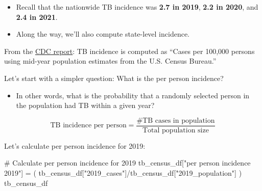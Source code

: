 \documentclass[
  letterpaper,
  DIV=11,
  numbers=noendperiod]{scrreprt}
\newenvironment{Shaded}{\begin{snugshade}}{\end{snugshade}}
\newcommand{\CommentTok}[1]{\textcolor[rgb]{0.37,0.37,0.37}{#1}}
\newcommand{\NormalTok}[1]{\textcolor[rgb]{0.00,0.23,0.31}{#1}}
\newcommand{\OperatorTok}[1]{\textcolor[rgb]{0.37,0.37,0.37}{#1}}
\newcommand{\StringTok}[1]{\textcolor[rgb]{0.13,0.47,0.30}{#1}}
\providecommand{\tightlist}{%
  \setlength{\itemsep}{0pt}\setlength{\parskip}{0pt}}\usepackage{longtable,booktabs,array}
\begin{document}
\begin{itemize}
\item
  Recall that the nationwide TB incidence was \textbf{2.7 in 2019},
  \textbf{2.2 in 2020}, and \textbf{2.4 in 2021}.
\item
  Along the way, we'll also compute state-level incidence.
\end{itemize}

From the
\href{https://www.cdc.gov/mmwr/volumes/71/wr/mm7112a1.htm?s_cid=mm7112a1_w\#T1_down}{CDC
report}: TB incidence is computed as ``Cases per 100,000 persons using
mid-year population estimates from the U.S. Census Bureau.''

Let's start with a simpler question: What is the per person incidence?

\begin{itemize}
\tightlist
\item
  In other words, what is the probability that a randomly selected
  person in the population had TB within a given year?
\end{itemize}

\[\text{TB incidence per person} = \frac{\text{\# TB cases in population}}{\text{Total population size}}\]

Let's calculate per person incidence for 2019:

\begin{Shaded}
\begin{Highlighting}[]
\CommentTok{\# Calculate per person incidence for 2019}
\NormalTok{tb\_census\_df[}\StringTok{"per person incidence 2019"}\NormalTok{] }\OperatorTok{=}\NormalTok{ (}
\NormalTok{    tb\_census\_df[}\StringTok{"2019\_cases"}\NormalTok{]}\OperatorTok{/}\NormalTok{tb\_census\_df[}\StringTok{"2019\_population"}\NormalTok{]}
\NormalTok{)}
\NormalTok{tb\_census\_df}
\end{Highlighting}
\end{Shaded}
\end{document}
